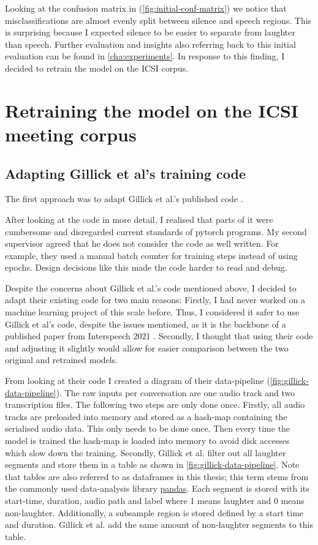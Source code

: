 \documentclass[bsc,frontabs,parskip,deptreport]{infthesis}
\begin{document}
Looking at the confusion matrix in (\autoref{fig:initial-conf-matrix}) we notice that misclassifications are almost evenly split between silence and speech regions. This is surprising because I expected silence to be easier to separate from laughter than speech.
Further evaluation and insights also referring back to this initial evaluation can be found in \autoref{cha:experiments}.
In response to this finding, I decided to retrain the model on the ICSI corpus. 


\chapter{Retraining the model on the ICSI meeting corpus} \label{cha:retraining}
\section{Adapting Gillick et al's training code} 
The first approach was to adapt Gillick et al.'s published code \citep{gillick-codebase}. 


After looking at the code in more detail, I realised that parts of it were cumbersome and disregarded current standards of pytorch programs. 
My second supervisor agreed that he does not consider the code as well written.
For example, they used a manual batch counter for training steps instead of using epochs.  
Design decisions like this made the code harder to read and debug. 

Despite the concerns about Gillick et al.'s code mentioned above, I decided to adapt their existing code for two main reasons:
Firstly, I had never worked on a machine learning project of this scale before. Thus, I considered it safer to use Gillick et al's code, despite the issues mentioned, as it is the backbone of a published paper from Interspeech 2021 \citep{gillick2021robust}. 
Secondly, I thought that using their code and adjusting it slightly would allow for easier comparison between the two original and retrained models. 

From looking at their code I created a diagram of their data-pipeline (\autoref{fig:gillick-data-pipeline}). The raw inputs per conversation are one audio track and two transcription files. 
The following two steps are only done once.
Firstly, all audio tracks are preloaded into memory and stored as a hash-map containing the serialised audio data. This only needs to be done once. Then every time the model is trained the hash-map is loaded into memory to avoid disk accesses which slow down the training. 
Secondly, Gillick et al. filter out all laughter segments and store them in a table as shown in \autoref{fig:gillick-data-pipeline}. Note that tables are also referred to as dataframes in this thesis; this term stems from the commonly used data-analysis library \href{https://pandas.pydata.org/}{pandas}.
Each segment is stored with its start-time, duration, audio path and label where 1 means laughter and 0 means non-laughter. Additionally, a subsample region is stored defined by a start time and duration. 
Gillick et al. add the same amount of non-laughter segments to this table. 
\end{document}
